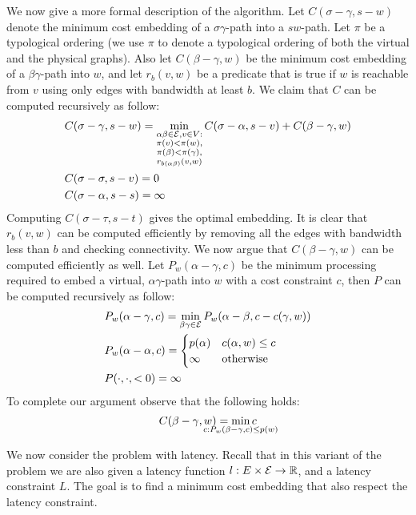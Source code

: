 We now give a more formal description of the algorithm.
Let $C(\sigma-\gamma , s-w)$ denote the
minimum cost embedding of a $\sigma\gamma $-path into a $sw$-path.
Let $\pi$ be a typological ordering 
(we use $\pi$ to denote a typological ordering of 
both the virtual and the physical graphs).
Also let $C(\beta-\gamma, w)$ be the minimum cost embedding of a $\beta\gamma$-path
into $w$, 
and let $r_b(v, w)$ be a predicate that is true if $w$ is reachable from $v$
using only edges with bandwidth at least $b$. 
We claim that $C$ can be computed recursively as follow:
\begin{align*}
&C(\sigma-\gamma , s-w) = 
\min_{\substack{
\alpha\beta \in \mathcal{E},  
v \in V:
\\
\pi(v) < \pi(w),
\\
\pi(\beta ) < \pi(\gamma ), 
\\
r_{b(\alpha\beta)}(v,w)
}}
C(\sigma-\alpha , s-v)
+
C(\beta-\gamma, w)
\\
&C(\sigma-\sigma , s-v) = 0
\\
&C(\sigma-\alpha , s-s) = \infty
\end{align*}
Computing $C(\sigma-\tau , s-t)$ gives the optimal embedding. 
It is clear that $r_b(v,w)$ can be computed efficiently by removing all the edges
with bandwidth less than $b$ and checking connectivity.
We now argue that $C(\beta-\gamma, w)$ can be computed efficiently as well.
Let $P_w(\alpha-\gamma, c)$ 
be the minimum processing required to embed a virtual, 
$\alpha\gamma$-path into $w$ with a cost constraint $c$, 
then $P$ can be computed recursively as follow:
\begin{align*}
&P_{w}(\alpha-\gamma, c) = 
\min_{\beta\gamma  \in \mathcal{E}} P_{w}(\alpha-\beta, c - c(\gamma, w))
\\
&P_w(\alpha-\alpha, c) = 
\begin{cases}
p(\alpha) & c(\alpha, w) \leq c
\\
\infty & \text{otherwise}
\end{cases}
\\
&P(\cdot, \cdot, <0) = \infty
\end{align*}
To complete our argument observe that the following holds:
$$C(\beta-\gamma, w) = \smashoperator{\min_{c : P_w(\beta-\gamma, c) \leq p(w)}}c$$ 

We now consider the \VPN{} problem with latency.
Recall that in this variant of the problem we are also given a latency function
$l : E \times \mathcal{E} \to \mathbb{R}$, and a latency constraint $L$.
The goal is to find a minimum cost embedding that also respect the latency
constraint.


